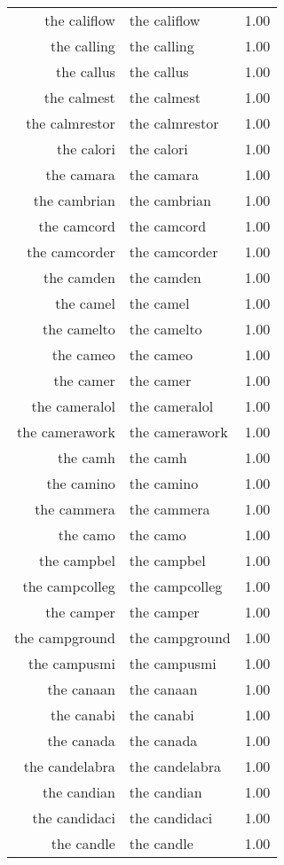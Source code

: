 \begin{table}[ht]
\begin{tabular}{rlr}
  the califlow & the califlow & 1.00 \\ 
  the calling & the calling & 1.00 \\ 
  the callus & the callus & 1.00 \\ 
  the calmest & the calmest & 1.00 \\ 
  the calmrestor & the calmrestor & 1.00 \\ 
  the calori & the calori & 1.00 \\ 
  the camara & the camara & 1.00 \\ 
  the cambrian & the cambrian & 1.00 \\ 
  the camcord & the camcord & 1.00 \\ 
  the camcorder & the camcorder & 1.00 \\ 
  the camden & the camden & 1.00 \\ 
  the camel & the camel & 1.00 \\ 
  the camelto & the camelto & 1.00 \\ 
  the cameo & the cameo & 1.00 \\ 
  the camer & the camer & 1.00 \\ 
  the cameralol & the cameralol & 1.00 \\ 
  the camerawork & the camerawork & 1.00 \\ 
  the camh & the camh & 1.00 \\ 
  the camino & the camino & 1.00 \\ 
  the cammera & the cammera & 1.00 \\ 
  the camo & the camo & 1.00 \\ 
  the campbel & the campbel & 1.00 \\ 
  the campcolleg & the campcolleg & 1.00 \\ 
  the camper & the camper & 1.00 \\ 
  the campground & the campground & 1.00 \\ 
  the campusmi & the campusmi & 1.00 \\ 
  the canaan & the canaan & 1.00 \\ 
  the canabi & the canabi & 1.00 \\ 
  the canada & the canada & 1.00 \\ 
  the candelabra & the candelabra & 1.00 \\ 
  the candian & the candian & 1.00 \\ 
  the candidaci & the candidaci & 1.00 \\ 
  the candle & the candle & 1.00 \\ 

\end{tabular}
\end{table}
